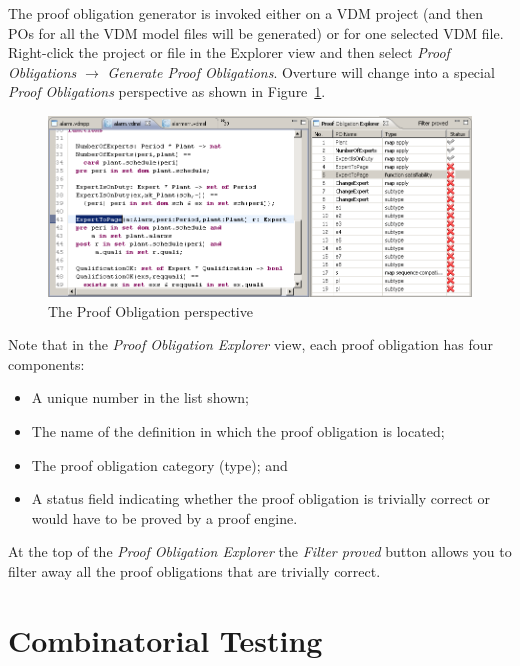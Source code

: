 \documentclass{overturerepchap}
\begin{document}
The proof obligation generator is invoked either on a VDM project (and
then POs for all the VDM model files will be generated) or for one
selected VDM file. Right-click the project or file in the Explorer view and
then select \emph{Proof Obligations} $\rightarrow$ \emph{Generate Proof
  Obligations}. Overture will change into a special
\emph{Proof Obligations} perspective as shown in
Figure~\ref{fig:POView}.  

\begin{figure}[htbp]
\begin{center}
\includegraphics[width=\textwidth]{figures/POView}
\caption{The Proof Obligation perspective\label{fig:POView}}
\end{center}
\end{figure}

Note that in the \emph{Proof Obligation Explorer} view, each proof
obligation has four components:
\begin{itemize}
\item A unique number in the list shown;
\item The name of the definition in which the proof obligation is
  located;
\item The proof obligation category (type); and
\item A status field indicating whether the proof obligation is
  trivially correct or would have to be proved by a proof engine.
\end{itemize}

At the top of the \emph{Proof Obligation Explorer} the \emph{Filter proved} button
allows you to filter away all the proof obligations that are trivially
correct. 

\chapter{Combinatorial Testing}\label{sec:testing}
\end{document}
